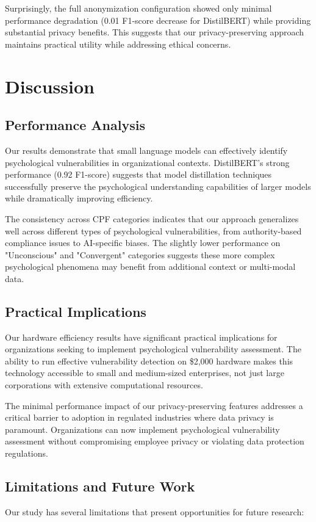 \documentclass[11pt,a4paper]{article}
\begin{document}
Surprisingly, the full anonymization configuration showed only minimal performance degradation (0.01 F1-score decrease for DistilBERT) while providing substantial privacy benefits. This suggests that our privacy-preserving approach maintains practical utility while addressing ethical concerns.

\section{Discussion}

\subsection{Performance Analysis}
Our results demonstrate that small language models can effectively identify psychological vulnerabilities in organizational contexts. DistilBERT's strong performance (0.92 F1-score) suggests that model distillation techniques successfully preserve the psychological understanding capabilities of larger models while dramatically improving efficiency.

The consistency across CPF categories indicates that our approach generalizes well across different types of psychological vulnerabilities, from authority-based compliance issues to AI-specific biases. The slightly lower performance on "Unconscious" and "Convergent" categories suggests these more complex psychological phenomena may benefit from additional context or multi-modal data.

\subsection{Practical Implications}
Our hardware efficiency results have significant practical implications for organizations seeking to implement psychological vulnerability assessment. The ability to run effective vulnerability detection on \$2,000 hardware makes this technology accessible to small and medium-sized enterprises, not just large corporations with extensive computational resources.

The minimal performance impact of our privacy-preserving features addresses a critical barrier to adoption in regulated industries where data privacy is paramount. Organizations can now implement psychological vulnerability assessment without compromising employee privacy or violating data protection regulations.

\subsection{Limitations and Future Work}
Our study has several limitations that present opportunities for future research:
\end{document}
